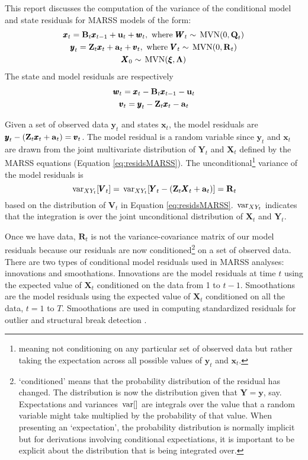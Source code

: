 \documentclass[]{article}
\def\xixi{\mbox{\boldmath $\xi$}}
\def\LAM{\mbox{\boldmath $\Lambda$}}
\def\UPS{\mbox{\boldmath $\Upsilon$}}
\def\XI{\mbox{\boldmath $\Xi$}}
\def\BB{\mbox{$\mathbf B$}}	\def\bb{\mbox{$\mathbf b$}} \def\Bb{\mbox{$\mathbf J$}} \def\Ba{\mbox{$\mathbf L$}} \def\Bm{\UPS}
\def\MVN{\,\textup{\textrm{MVN}}}
\def\QQ{\mbox{$\mathbf Q$}}	 \def\qq{\mbox{$\mathbf q$}} \def\Qb{\mbox{$\mathbf G$}}  \def\Qm{\mathbb{Q}}
\def\RR{\mbox{$\mathbf R$}}	 \def\rr{\mbox{$\mathbf r$}} \def\Rb{\mbox{$\mathbf H$}}	\def\Rm{\mathbb{R}}
\def\VV{\mbox{$\pmb{V}$}}	\def\vv{\mbox{$\pmb{v}$}}
\def\WW{\mbox{$\pmb{W}$}}	\def\ww{\mbox{$\pmb{w}$}}
\def\XX{\mbox{$\pmb{X}$}}	\def\xx{\mbox{$\pmb{x}$}}
\def\YY{\mbox{$\pmb{Y}$}}	\def\yy{\mbox{$\pmb{y}$}}
\def\ZZ{\mbox{$\mathbf Z$}}	\def\zz{\mbox{$\mathbf z$}}	\def\Zb{\mbox{$\mathbf M$}} \def\Za{\mbox{$\mathbf N$}} \def\Zm{\XI}
\def\var{\,\textup{\textrm{var}}}
\begin{document}
This report discusses the computation of the variance of the conditional model and state residuals for MARSS models of the  form:
\begin{equation}\label{eq:residsMARSS}
\begin{gathered}
\xx_t = \BB_t\xx_{t-1} + \uu_t + \ww_t, \text{ where } \WW_t \sim \MVN(0,\QQ_t)\\
\yy_t = \ZZ_t\xx_t + \aa_t + \vv_t, \text{ where } \VV_t \sim \MVN(0,\RR_t)\\
\XX_0 \sim \MVN(\xixi,\LAM)
\end{gathered}
\end{equation}
The state and model residuals are respectively
\begin{equation}\label{eq:resids}
\begin{gathered}
\ww_t = \xx_t - \BB_t\xx_{t-1} - \uu_t\\
\vv_t = \yy_t - \ZZ_t\xx_t - \aa_t
\end{gathered}
\end{equation}

Given a set of observed data $\yy_t$ and states $\xx_t$, the model residuals are $\yy_t - (\ZZ_t \xx_t + \aa_t)=\vv_t$.  The model residual is a random variable since $\yy_t$ and $\xx_t$ are drawn from the joint multivariate distribution of $\YY_t$ and $\XX_t$ defined by the MARSS equations (Equation \ref{eq:residsMARSS}).
The unconditional\footnote{meaning not conditioning on any particular set of observed data but rather taking the expectation across all possible values of $\yy_t$ and $\xx_t$.} variance of the model residuals is
\begin{equation}\label{eqn:unconditiondistofVt}
\var_{XY_t}[\VV_t] = \var_{XY_t}[\YY_t - (\ZZ_t \XX_t + \aa_t)] = \RR_t\\
\end{equation}
based on the distribution of $\VV_t$ in Equation \ref{eq:residsMARSS}.  $\var_{XY_t}$ indicates that the integration is over the joint unconditional distribution of $\XX_t$ and $\YY_t$. 

Once we have data, $\RR_t$ is not the variance-covariance matrix of our model residuals because our residuals are now conditioned\footnote{`conditioned' means that the probability distribution of the residual has changed. The distribution is now the distribution given that $\YY=\yy$, say. Expectations and variances $\var[ ]$ are integrals over the value that a random variable might take multiplied by the probability of that value. When presenting an   `expectation', the probability distribution is normally implicit but for derivations involving conditional expectiations, it is important to be explicit about the distribution that is being integrated over.} on a set of observed data. There are two types of conditional model residuals used in MARSS analyses: innovations and smoothations.  Innovations are the model residuals at time $t$ using the expected value of $\XX_t$ conditioned on the data from 1 to $t-1$.  Smoothations  are the model residuals using the expected value of $\XX_t$ conditioned on all the data, $t=1$ to $T$.  Smoothations are used in computing standardized residuals for outlier and structural break detection \citep{Harveyetal1998, deJongPenzer1998, CommandeurKoopman2007}.  
\end{document}
